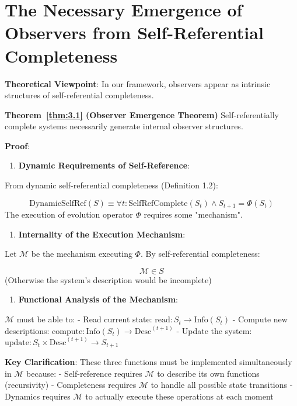 
\section{The Necessary Emergence of Observers from Self-Referential Completeness}
\label{sec:ch05_quantum:the-necessary-emergence-of-observers-from-self-referential-completeness}

\textbf{Theoretical Viewpoint}: In our framework, observers appear as intrinsic structures of self-referential completeness.

\textbf{Theorem~\ref{thm:3.1} (Observer Emergence Theorem)}
\label{thm:3.1}
Self-referentially complete systems necessarily generate internal observer structures.

\textbf{Proof}:

\begin{enumerate}
\item \textbf{Dynamic Requirements of Self-Reference}:
\end{enumerate}
   From dynamic self-referential completeness (Definition 1.2):
   
\begin{equation}
\text{DynamicSelfRef}(S) \equiv \forall t: \text{SelfRefComplete}(S_t) \land S_{t+1} = \Phi(S_t)
\end{equation}
   The execution of evolution operator $\Phi$ requires some "mechanism".
   
\begin{enumerate}
\item \textbf{Internality of the Execution Mechanism}:
\end{enumerate}
   Let $\mathcal{M}$ be the mechanism executing $\Phi$. By self-referential completeness:
   
\begin{equation}
\mathcal{M} \in S
\end{equation}
   (Otherwise the system's description would be incomplete)
   
\begin{enumerate}
\item \textbf{Functional Analysis of the Mechanism}:
\end{enumerate}
   $\mathcal{M}$ must be able to:
   - Read current state: $\text{read}: S_t \to \text{Info}(S_t)$
   - Compute new descriptions: $\text{compute}: \text{Info}(S_t) \to \text{Desc}^{(t+1)}$
   - Update the system: $\text{update}: S_t \times \text{Desc}^{(t+1)} \to S_{t+1}$
   
   \textbf{Key Clarification}: These three functions must be implemented simultaneously in $\mathcal{M}$ because:
   - Self-reference requires $\mathcal{M}$ to describe its own functions (recursivity)
   - Completeness requires $\mathcal{M}$ to handle all possible state transitions
   - Dynamics requires $\mathcal{M}$ to actually execute these operations at each moment
   
